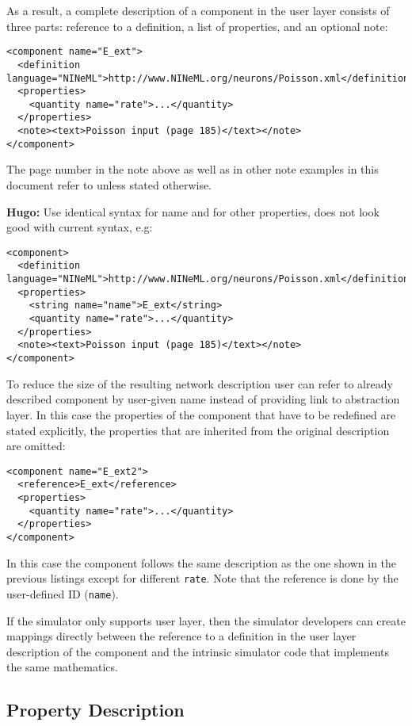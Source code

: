 \documentclass{article}
\newcommand{\suggestion}[2]{%
\begin{center}
\colorbox{issuecolor}{\parbox{0.8\linewidth}{\textbf{#1:} #2}}
\end{center}%
}
\begin{document}
As a result, a complete description of a component in the user layer consists of
three parts: reference to a definition, a list of properties, and an optional
note:
\begin{verbatim}
<component name="E_ext">
  <definition language="NINeML">http://www.NINeML.org/neurons/Poisson.xml</definition>
  <properties>
    <quantity name="rate">...</quantity>
  </properties>
  <note><text>Poisson input (page 185)</text></note>
</component>
\end{verbatim}
The page number in the note above as well as in other note examples
in this document refer to \cite{brunel-00} unless stated otherwise.

\suggestion{Hugo}{Use identical syntax for name and for other properties,
does not look good with current syntax, e.g:}
\begin{verbatim}
<component>
  <definition language="NINeML">http://www.NINeML.org/neurons/Poisson.xml</definition>
  <properties>
    <string name="name">E_ext</string>
    <quantity name="rate">...</quantity>
  </properties>
  <note><text>Poisson input (page 185)</text></note>
</component>
\end{verbatim}

To reduce the size of the resulting network description user can refer to
already described component by user-given name instead of providing link to
abstraction layer. In this case the properties of the component that have to be
redefined are stated explicitly, the properties that are inherited from the
original description are omitted:
\begin{verbatim}
<component name="E_ext2">
  <reference>E_ext</reference>
  <properties>
    <quantity name="rate">...</quantity>
  </properties>
</component>
\end{verbatim}
In this case the component follows the same description as the one shown in the
previous listings except for different {\tt rate}. Note that the reference
is done by the user-deﬁned ID ({\tt name}).

If the simulator only supports user layer, then the simulator developers
can create mappings directly between the reference to a definition in the user
layer description of the component and the intrinsic simulator code that implements
the same mathematics.

\subsection{Property Description}
\label{secProp}
\end{document}
